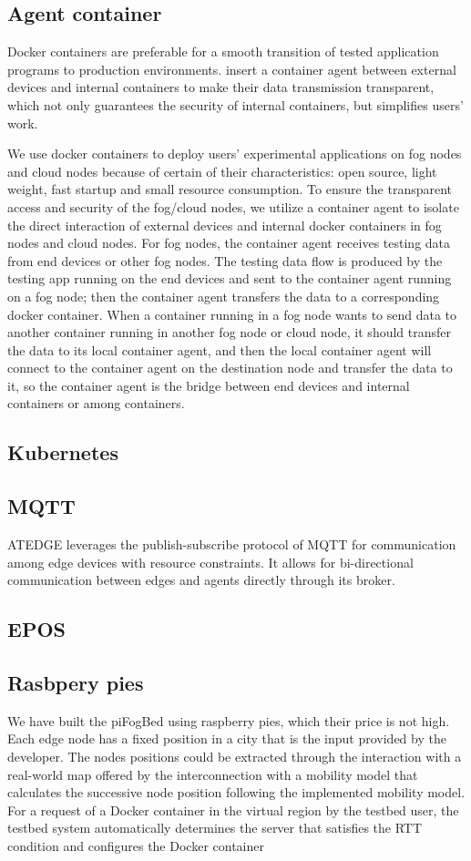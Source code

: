 \documentclass[conference]{IEEEtran}
\begin{document}
\subsection{Agent container}
\par Docker containers are preferable for a smooth transition of tested application programs to production environments.
insert a container agent between external devices and internal containers to make their data
transmission transparent, which not only guarantees the security of internal containers, but simplifies
users' work.

We use docker containers to deploy users' experimental applications on fog nodes and cloud nodes because of certain of their characteristics: open source, light weight, fast startup and small resource consumption.
To ensure the transparent access and security of the fog/cloud nodes, we utilize
a container agent to isolate the direct interaction of external devices and internal docker containers in
fog nodes and cloud nodes. For fog nodes, the container agent receives testing data from end devices
or other fog nodes. The testing data flow is produced by the testing app running on the end devices
and sent to the container agent running on a fog node; then the container agent transfers the data
to a corresponding docker container. When a container running in a fog node wants to send data
to another container running in another fog node or cloud node, it should transfer the data to its
local container agent, and then the local container agent will connect to the container agent on the
destination node and transfer the data to it, so the container agent is the bridge between end devices
and internal containers or among containers.
\subsection{Kubernetes}
\subsection{MQTT}
ATEDGE leverages the publish-subscribe protocol of MQTT for communication among edge devices with resource constraints. It allows for bi-directional communication between edges and agents directly through its broker.
\subsection{EPOS}
\subsection{Rasbpery pies}
We have built the piFogBed using raspberry pies, which their price is not high.
Each edge node has a fixed position in a city that is the input provided by the developer.
The nodes positions could be extracted through the interaction with a real-world map offered by the interconnection with a mobility model that calculates the successive node position following the implemented mobility model.
 For a request of a Docker container in the
virtual region by the testbed user, the testbed system automatically determines the server that satisfies the RTT condition and configures the Docker container
\end{document}
